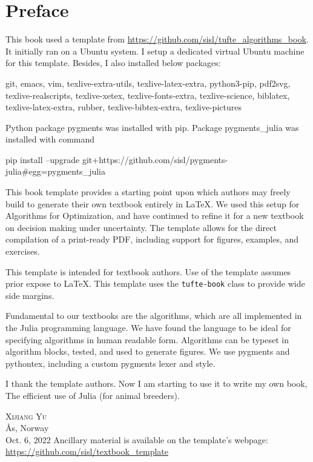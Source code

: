 \chapter*{Preface}

This book used a template from \url{https://github.com/sisl/tufte_algorithms_book}.
It initially ran on a Ubuntu system.
I setup a dedicated virtual Ubuntu machine for this template.
Besides, I also installed below packages:

git,
emacs,
vim,
texlive-extra-utils,
texlive-latex-extra,
python3-pip,
pdf2svg,
texlive-realscripts,
texlive-xetex,
texlive-fonts-extra,
texlive-science,
biblatex,
texlive-latex-extra,
rubber,
texlive-bibtex-extra,
texlive-pictures

Python package pygments was installed with pip.
Package pygments\_julia was installed with command

pip install --upgrade git+https://github.com/sisl/pygments-julia\#egg=pygments\_julia

This book template provides a starting point upon which authors may freely build to generate their own textbook entirely in \LaTeX.
We used this setup for Algorithms for Optimization, and have continued to refine it for a new textbook on decision making under uncertainty.
The template allows for the direct compilation of a print-ready PDF, including support for figures, examples, and exercises.

This template is intended for textbook authors.
Use of the template assumes prior expose to \LaTeX.
This template uses the \texttt{tufte-book} class to provide wide side margins.

Fundamental to our textbooks are the algorithms, which are all implemented in the Julia programming language.
We have found the language to be ideal for specifying algorithms in human readable form.
Algorithms can be typeset in algorithm blocks, tested, and used to generate figures.
We use pygments and pythontex, including a custom pygments lexer and style.

I thank the template authors.
Now I am starting to use it to write my own book,
The efficient use of Julia (for animal breeders).

\vspace{5ex}
\noindent\textsc{Xijiang Yu}\\
\AA s, Norway\\
Oct. 6, 2022
\vfill
\noindent Ancillary material is available on the template's webpage:\\
\noindent\url{https://github.com/sisl/textbook_template}
